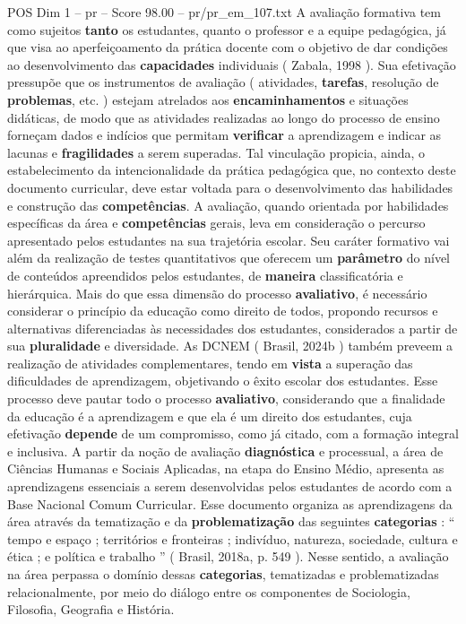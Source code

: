 \begin{textsample}{POS Dim 1 – pr – Score 98.00 – pr/pr\_em\_107.txt}
A avaliação formativa tem como sujeitos \textbf{tanto} os estudantes, quanto o professor e a equipe pedagógica, já que visa ao aperfeiçoamento da prática docente com o objetivo de dar condições ao desenvolvimento das \textbf{capacidades} individuais ( Zabala, 1998 ).
Sua efetivação pressupõe que os instrumentos de avaliação ( atividades, \textbf{tarefas}, resolução de \textbf{problemas}, etc. ) estejam atrelados aos \textbf{encaminhamentos} e situações didáticas, de modo que as atividades realizadas ao longo do processo de ensino forneçam dados e indícios que permitam \textbf{verificar} a aprendizagem e indicar as lacunas e \textbf{fragilidades} a serem superadas.
Tal vinculação propicia, ainda, o estabelecimento da intencionalidade da prática pedagógica que, no contexto deste documento curricular, deve estar voltada para o desenvolvimento das habilidades e construção das \textbf{competências}.
A avaliação, quando orientada por habilidades específicas da área e \textbf{competências} gerais, leva em consideração o percurso apresentado pelos estudantes na sua trajetória escolar.
Seu caráter formativo vai além da realização de testes quantitativos que oferecem um \textbf{parâmetro} do nível de conteúdos apreendidos pelos estudantes, de \textbf{maneira} classificatória e hierárquica.
Mais do que essa dimensão do processo \textbf{avaliativo}, é necessário considerar o princípio da educação como direito de todos, propondo recursos e alternativas diferenciadas às necessidades dos estudantes, considerados a partir de sua \textbf{pluralidade} e diversidade.
As DCNEM ( Brasil, 2024b ) também preveem a realização de atividades complementares, tendo em \textbf{vista} a superação das dificuldades de aprendizagem, objetivando o êxito escolar dos estudantes.
Esse processo deve pautar todo o processo \textbf{avaliativo}, considerando que a finalidade da educação é a aprendizagem e que ela é um direito dos estudantes, cuja efetivação \textbf{depende} de um compromisso, como já citado, com a formação integral e inclusiva.
A partir da noção de avaliação \textbf{diagnóstica} e processual, a área de Ciências Humanas e Sociais Aplicadas, na etapa do Ensino Médio, apresenta as aprendizagens essenciais a serem desenvolvidas pelos estudantes de acordo com a Base Nacional Comum Curricular.
Esse documento organiza as aprendizagens da área através da tematização e da \textbf{problematização} das seguintes \textbf{categorias} : “ tempo e espaço ; territórios e fronteiras ; indivíduo, natureza, sociedade, cultura e ética ; e política e trabalho ” ( Brasil, 2018a, p. 549 ).
Nesse sentido, a avaliação na área perpassa o domínio dessas \textbf{categorias}, tematizadas e problematizadas relacionalmente, por meio do diálogo entre os componentes de Sociologia, Filosofia, Geografia e História.

\end{textsample}
